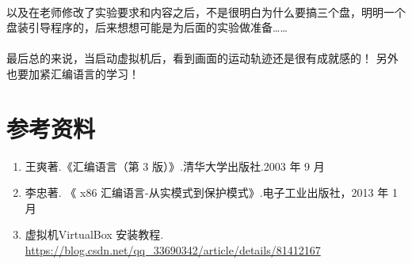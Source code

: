 \documentclass[12pt]{article}
\begin{document}
\paragraph{}\quad 以及在老师修改了实验要求和内容之后，不是很明白为什么要搞三个盘，明明一个盘装引导程序的，后来想想可能是为后面的实验做准备……
\paragraph{}\quad 最后总的来说，当启动虚拟机后，看到画面的运动轨迹还是很有成就感的！
另外也要加紧汇编语言的学习！

\section{\LARGE 参考资料}
\begin{enumerate}
\item 王爽著.《汇编语言（第 3 版）》.清华大学出版社.2003 年 9 月
\item 李忠著. 《 x86 汇编语言-从实模式到保护模式》.电子工业出版社，2013 年 1 月
\item 虚拟机VirtualBox 安装教程. \url{https://blog.csdn.net/qq_33690342/article/details/81412167}
\end{enumerate}
\end{document}
